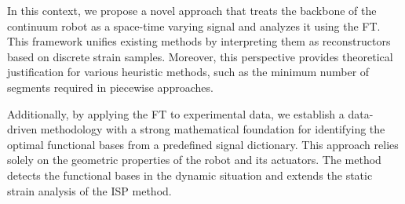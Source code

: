 In this context, we propose a novel approach that treats the backbone of the continuum robot as a space-time varying signal and analyzes it using the \ac{FT}. This framework unifies existing methods by interpreting them as reconstructors based on discrete strain samples. Moreover, this perspective provides theoretical justification for various heuristic methods, such as the minimum number of segments required in piecewise approaches.

Additionally, by applying the \ac{FT} to experimental data, we establish a data-driven methodology with a strong mathematical foundation for identifying the optimal functional bases from a predefined signal dictionary. This approach relies solely on the geometric properties of the robot and its actuators. 
The method detects the functional bases in the dynamic situation and extends the static strain analysis of the \ac{ISP} method.